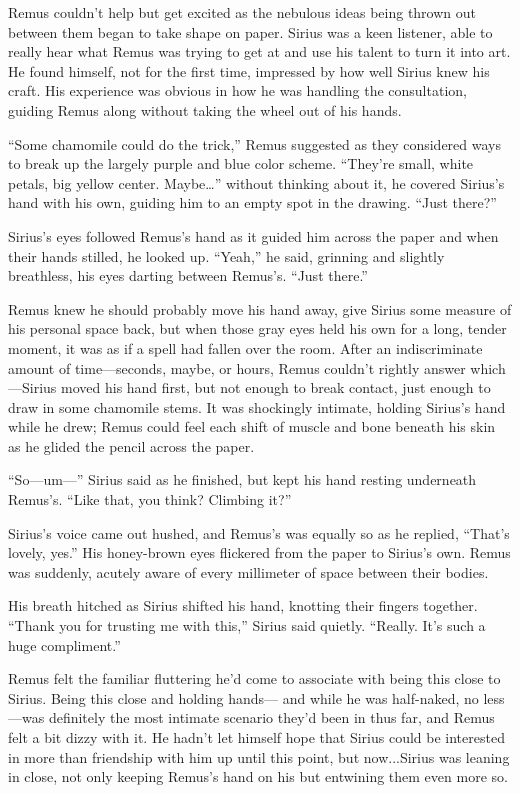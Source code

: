 Remus couldn’t help but get excited as the nebulous ideas being thrown out between them began to take shape on paper. Sirius was a keen listener, able to really hear what Remus was trying to get at and use his talent to turn it into art. He found himself, not for the first time, impressed by how well Sirius knew his craft. His experience was obvious in how he was handling the consultation, guiding Remus along without taking the wheel out of his hands.

“Some chamomile could do the trick,” Remus suggested as they considered ways to break up the largely purple and blue color scheme. “They’re small, white petals, big yellow center. Maybe…” without thinking about it, he covered Sirius’s hand with his own, guiding him to an empty spot in the drawing. “Just there?”

Sirius’s eyes followed Remus’s hand as it guided him across the paper and when their hands stilled, he looked up. “Yeah,” he said, grinning and slightly breathless, his eyes darting between Remus’s. “Just there.”

Remus knew he should probably move his hand away, give Sirius some measure of his personal space back, but when those gray eyes held his own for a long, tender moment, it was as if a spell had fallen over the room. After an indiscriminate amount of time—seconds, maybe, or hours, Remus couldn’t rightly answer which—Sirius moved his hand first, but not enough to break contact, just enough to draw in some chamomile stems. It was shockingly intimate, holding Sirius’s hand while he drew; Remus could feel each shift of muscle and bone beneath his skin as he glided the pencil across the paper.

“So—um—” Sirius said as he finished, but kept his hand resting underneath Remus’s. “Like that, you think? Climbing it?”

Sirius’s voice came out hushed, and Remus’s was equally so as he replied, “That’s lovely, yes.” His honey-brown eyes flickered from the paper to Sirius’s own. Remus was suddenly, acutely aware of every millimeter of space between their bodies.

His breath hitched as Sirius shifted his hand, knotting their fingers together. “Thank you for trusting me with this,” Sirius said quietly. “Really. It’s such a huge compliment.”

Remus felt the familiar fluttering he’d come to associate with being this close to Sirius. Being this close and holding hands— and while he was half-naked, no less—was definitely the most intimate scenario they’d been in thus far, and Remus felt a bit dizzy with it. He hadn’t let himself hope that Sirius could be interested in more than friendship with him up until this point, but now...Sirius was leaning in close, not only keeping Remus’s hand on his but entwining them even more so.

